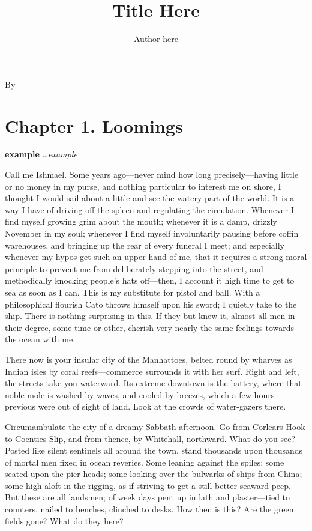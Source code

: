\documentclass[12pt,ebook,oneside,openany]{memoir} %
\author{Author here}
\title{Title Here}
\makeatletter
\def\maketitle{%
  \null
  \thispagestyle{empty}%
  \vfill
  \begin{center}\leavevmode
    \normalfont
    {\Huge\@title\par}%
    \hrulefill\par
    \vskip 3cm
    {\Huge By \@author\par}%
  \end{center}%
  \vfill
  \null
  \cleardoublepage
}
\makeatother
\begin{document}
\maketitle

\begin{KeepFromToc}
  {\small\tableofcontents*}
\end{KeepFromToc}

\mainmatter

\chapter{Chapter 1. Loomings}

\textbf{example} \ldots \textit{example}

Call me Ishmael. Some years ago—never mind how long precisely—having little or no money in my purse, and nothing particular to interest me on shore, I thought I would sail about a little and see the watery part of the world. It is a way I have of driving off the spleen and regulating the circulation. Whenever I find myself growing grim about the mouth; whenever it is a damp, drizzly November in my soul; whenever I find myself involuntarily pausing before coffin warehouses, and bringing up the rear of every funeral I meet; and especially whenever my hypos get such an upper hand of me, that it requires a strong moral principle to prevent me from deliberately stepping into the street, and methodically knocking people’s hats off—then, I account it high time to get to sea as soon as I can. This is my substitute for pistol and ball. With a philosophical flourish Cato throws himself upon his sword; I quietly take to the ship. There is nothing surprising in this. If they but knew it, almost all men in their degree, some time or other, cherish very nearly the same feelings towards the ocean with me.

There now is your insular city of the Manhattoes, belted round by wharves as Indian isles by coral reefs—commerce surrounds it with her surf. Right and left, the streets take you waterward. Its extreme downtown is the battery, where that noble mole is washed by waves, and cooled by breezes, which a few hours previous were out of sight of land. Look at the crowds of water-gazers there.

Circumambulate the city of a dreamy Sabbath afternoon. Go from Corlears Hook to Coenties Slip, and from thence, by Whitehall, northward. What do you see?—Posted like silent sentinels all around the town, stand thousands upon thousands of mortal men fixed in ocean reveries. Some leaning against the spiles; some seated upon the pier-heads; some looking over the bulwarks of ships from China; some high aloft in the rigging, as if striving to get a still better seaward peep. But these are all landsmen; of week days pent up in lath and plaster—tied to counters, nailed to benches, clinched to desks. How then is this? Are the green fields gone? What do they here?
\end{document}
